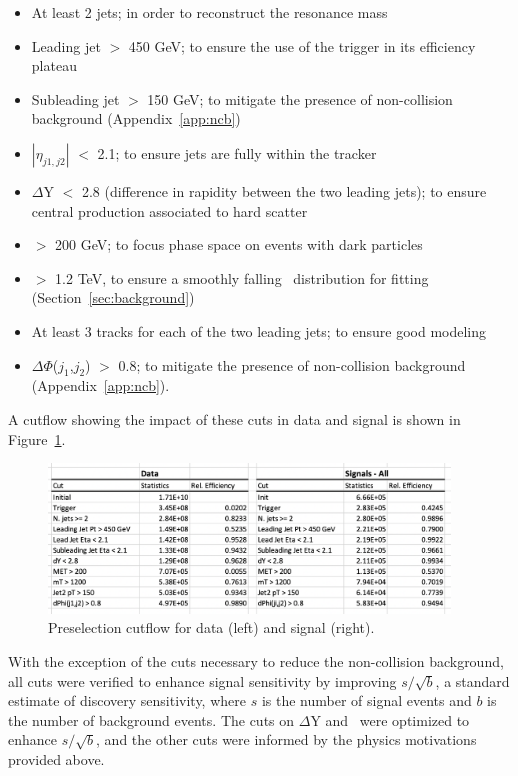 \begin{itemize}
\item At least 2 jets; in order to reconstruct the resonance mass
\item Leading jet \pt $>$ 450 GeV; to ensure the use of the trigger in its efficiency plateau
\item Subleading jet \pt $>$ 150 GeV; to mitigate the presence of non-collision background (Appendix~\ref{app:ncb})
\item $|\eta_{j1,j2}|$ $<$ 2.1; to ensure jets are fully within the tracker
\item $\Delta$Y $<$ 2.8 (difference in rapidity between the two leading jets); to ensure central production associated to hard scatter  
\item \met $>$ 200 GeV; to focus phase space on events with dark particles 
\item \mt $>$ 1.2 TeV, to ensure a smoothly falling \mt~distribution for fitting (Section~\ref{sec:background})
\item At least 3 tracks for each of the two leading jets; to ensure good modeling
\item $\Delta\Phi$($j_1$,$j_2$) $>$ 0.8; to mitigate the presence of non-collision background (Appendix~\ref{app:ncb}).
\end{itemize}

A cutflow showing the impact of these cuts in data and signal is shown in Figure~\ref{fig:presel_cutflow}. 
\begin{figure}[!htbp]
\centering
   \includegraphics[width=0.95\textwidth]{figures/eventsel/preselection/presel_cutflow}
    \caption{Preselection cutflow for data (left) and signal (right).
    \label{fig:presel_cutflow}}
\end{figure}

With the exception of the cuts necessary to reduce the non-collision background, all cuts were verified to enhance signal sensitivity by improving $s/\sqrt{b}$, a standard estimate of discovery sensitivity, where $s$ is the number of signal events and $b$ is the number of background events. The cuts on $\Delta$Y and \met~were optimized to enhance $s/\sqrt{b}$, and the other cuts were informed by the physics motivations provided above. \par


